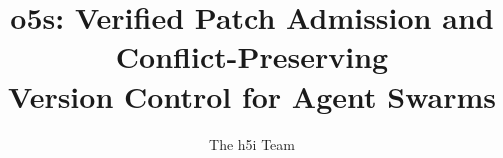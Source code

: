 \newcommand{\sys}{\textnormal{o5s}}
\newcommand{\code}[1]{\texttt{\small #1}}
\setlength{\emergencystretch}{1.5em}
\setlength{\parskip}{0pt plus 3pt}
\renewcommand{\figurename}{Fig.}
\newcommand{\past}{\operatorname{Past}}
\newcommand{\deps}{\operatorname{deps}}
\newcommand{\heads}{\operatorname{Heads}}
\newcommand{\Live}{\operatorname{Live}}
\newcommand{\Seg}{\operatorname{Seg}}
\newcommand{\Prec}{\operatorname{Prec}}
\newcommand{\Obs}{\operatorname{Obs}}
\newcommand{\Ok}{\mathsf{Ok}}
\newcommand{\Err}{\mathsf{Err}}
\newtheorem{definition}{Definition}
\newtheorem{claim}{Theorem}
\title[o5s: Verified Version Control for Agent Swarms]{o5s: Verified Patch Admission and Conflict-Preserving\texorpdfstring{\\}{ }Version Control for Agent Swarms}
\author{The h5i Team}
\renewcommand{\shortauthors}{The h5i Team}

